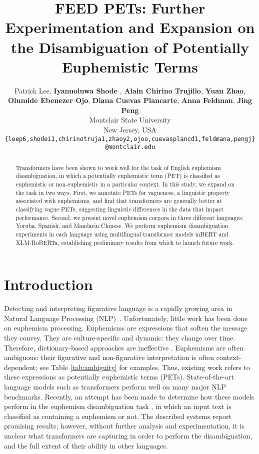 \documentclass[11pt]{article}
\title{FEED PETs: Further Experimentation and Expansion on the Disambiguation of Potentially Euphemistic Terms\\
}
\author{Patrick Lee,  {\bf Iyanuoluwa Shode }, {\bf Alain Chirino Trujillo}, {\bf Yuan Zhao}, \\ {\bf Olumide Ebenezer Ojo}, {\bf Diana Cuevas Plancarte},  {\bf Anna Feldman}, {\bf Jing Peng}\\
      Montclair State University\\New Jersey, USA\\
      \texttt{\{leep6,shodei1,chirinotruja1,zhaoy2,ojoo,cuevasplancd1,feldmana,pengj\}}\\
        \texttt{@montclair.edu}}
\begin{document}
\maketitle
\begin{abstract}
Transformers have been shown to work well for the task of English euphemism disambiguation, in which a potentially euphemistic term (PET) is classified as euphemistic or non-euphemistic in a particular context. In this study, we expand on the task in two ways. First, we annotate PETs for vagueness, a linguistic property associated with euphemisms, and find that transformers are generally better at classifying vague PETs, suggesting linguistic differences in the data that impact performance. Second, we present novel euphemism corpora in three different languages: Yoruba, Spanish, and Mandarin Chinese. We perform euphemism disambiguation experiments in each language using multilingual transformer models mBERT and XLM-RoBERTa, establishing preliminary results from which to launch future work. 
\end{abstract}

\section{Introduction}

Detecting and interpreting figurative language is a rapidly growing area in Natural Language Processing (NLP)~\cite{chakrabarty2022flute,10.5555/3298023.3298038}. Unfortunately, little work has been done on euphemism processing. Euphemisms are expressions that soften the message they convey. They are culture-specific and dynamic: they change over time. Therefore, dictionary-based approaches are ineffective \cite{betram1998,holder2002,rawson2003dictionary}. Euphemisms are often ambiguous: their figurative and non-figurative interpretation is often context-dependent; see Table \ref{tab:ambiguity} for examples. Thus, existing work refers to these expressions as potentially euphemistic terms (PETs). State-of-the-art language models such as transformers perform well on many major NLP benchmarks. Recently, an attempt has been made to determine how these models perform in the euphemism disambiguation task \cite{lee2022report}, in which an input text is classified as containing a euphemism or not. The described systems report promising results; however, without further analysis and experimentation, it is unclear what transformers are capturing in order to perform the disambiguation, and the full extent of their ability in other languages.
\end{document}
